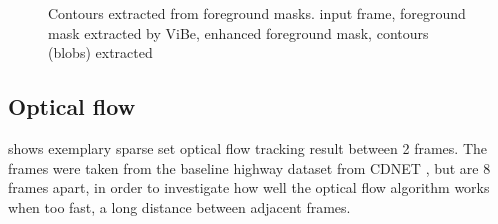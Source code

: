 \begin{figure}[htb]
  \centering
  \caption{Contours extracted from foreground masks.  input frame,  foreground mask extracted by ViBe,  enhanced foreground mask,  contours (blobs) extracted}
  \label{imp:cca}
\end{figure}


\subsection{Optical flow}

 shows exemplary sparse set optical flow tracking result between 2 frames. The frames were taken from the baseline highway dataset from CDNET \cite{goyette2012changedetection}, but are 8 frames apart, in order to investigate how well the optical flow algorithm works when  too fast,  a long distance between adjacent frames.

